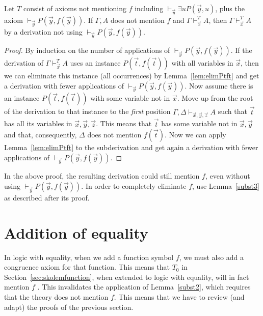 \documentclass[10pt,a4paper]{article}
\begin{document}
\begin{theorem}\label{thm:altskolem}
Let $T$ consist of axioms not mentioning $f$ including 
$\vdash_{\vec{y}} \exists u P(\vec{y},u)$,  
plus the axiom $\vdash_{\vec{y}} P(\vec{y},f(\vec{y}))$.
If  $\Gamma,A$ does not mention $f$ and $\Gamma\vdash_{\vec{x}}^{T} A$, then
$\Gamma\vdash_{\vec{x}}^T A$ by a derivation not using
$\vdash_{\vec{y}} P(\vec{y},f(\vec{y}))$.
\end{theorem}

\begin{proof}
By induction on the number of applications of $\vdash_{\vec{y}} P(\vec{y},f(\vec{y}))$.
If the derivation of $\Gamma\vdash_{\vec{x}}^{T} A$ uses an instance
$P(\vec{t},f(\vec{t}))$ with all variables in $\vec{x}$, then we can eliminate this instance
(all occurrences)
by Lemma~\ref{lem:elimPtft} and get a derivation with fewer applications of 
$\vdash_{\vec{y}} P(\vec{y},f(\vec{y}))$. Now assume there is an instance
$P(\vec{t},f(\vec{t}))$ with some variable not in $\vec{x}$. Move up from the root
of the derivation to that instance to the \emph{first} position
$\Gamma,\Delta\vdash_{\vec{x},\vec{y},\vec{z}} A$ such that
$\vec{t}$ has all its variables in $\vec{x},\vec{y},\vec{z}$. This means that $\vec{t}$
has some variable not in $\vec{x},\vec{y}$ and that, consequently, 
$\Delta$ does not mention $f(\vec{t})$. Now we can apply Lemma~\ref{lem:elimPtft}
to the subderivation and get again a derivation with fewer applications of 
$\vdash_{\vec{y}} P(\vec{y},f(\vec{y}))$.
\end{proof}

In the above proof, the resulting derivation could still mention $f$, even
without using $\vdash_{\vec{y}} P(\vec{y},f(\vec{y}))$. 
In order to completely eliminate $f$, use Lemma~\ref{subst3} as described after
its proof.


\section{Addition of equality}

In logic with equality, when we add a function symbol $f$, 
we must also add a congruence axiom for that function. 
This means that $T_0$ in Section~\ref{sec:skolemfunction},
when extended to  logic with equality, will in fact mention $f$ . 
This invalidates the application of Lemma~\ref{subst2}, 
which requires that the theory does not mention $f$.
This means that we have to review (and adapt) the proofs of the
previous section.
\end{document}
